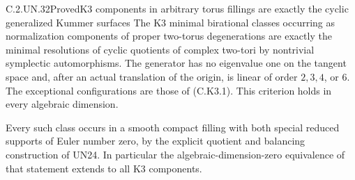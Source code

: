\begin{statement}{C.2.UN.32}{Proved}{K3 components in arbitrary torus fillings are exactly the cyclic generalized Kummer surfaces}
The K3 minimal birational classes occurring as
normalization components of proper two-torus
degenerations are exactly the minimal resolutions
of cyclic quotients of complex two-tori by
nontrivial symplectic automorphisms.
The generator has no eigenvalue one on the tangent space
and, after an actual translation of the origin,
is linear of order $2,3,4$, or $6$.
The exceptional configurations are those of
(C.K3.1). This criterion holds in every
algebraic dimension.

Every such class occurs in a smooth compact
filling with both special reduced supports
of Euler number zero, by the explicit quotient
and balancing construction of UN24.
In particular the algebraic-dimension-zero
equivalence of that statement extends to
all K3 components.
\end{statement}
